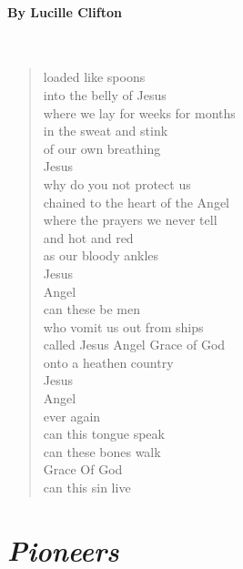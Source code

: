 \paragraph{By Lucille Clifton}~
\begin{verse}
	loaded like spoons\\
	into the belly of Jesus\\
	where we lay for weeks for months\\
	in the sweat and stink\\
	of our own breathing\\
	Jesus\\
	why do you not protect us\\
	chained to the heart of the Angel\\
	where the prayers we never tell\\
	and hot and red\\
	as our bloody ankles\\
	Jesus\\
	Angel\\
	can these be men\\
	who vomit us out from ships\\
	called Jesus    Angel    Grace of God\\
	onto a heathen country\\
	Jesus\\
	Angel\\
	ever again\\
	can this tongue speak\\
	can these bones walk\\
	Grace Of God\\
	can this sin live
\end{verse}

\newpage
\section*{\emph{Pioneers}}
